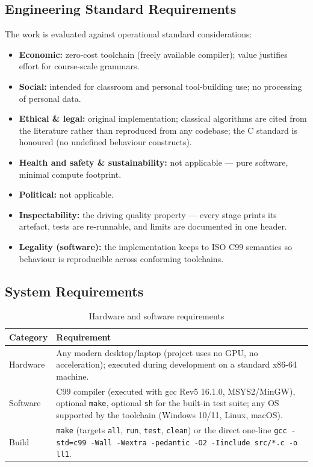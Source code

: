 \documentclass[12pt,a4paper,oneside,openany]{report}
\newcommand{\code}[1]{\texttt{#1}}
\begin{document}
\subsection{Engineering Standard Requirements}
The work is evaluated against operational standard considerations:
\begin{itemize}
  \item \textbf{Economic:} zero-cost toolchain (freely available
        compiler); value justifies effort for course-scale grammars.
  \item \textbf{Social:} intended for classroom and personal
        tool-building use; no processing of personal data.
  \item \textbf{Ethical \& legal:} original implementation; classical
        algorithms are cited from the literature rather than reproduced
        from any codebase; the C standard is honoured (no undefined
        behaviour constructs).
  \item \textbf{Health and safety \& sustainability:} not applicable ---
        pure software, minimal compute footprint.
  \item \textbf{Political:} not applicable.
  \item \textbf{Inspectability:} the driving quality property --- every
        stage prints its artefact, tests are re-runnable, and limits are
        documented in one header.
  \item \textbf{Legality (software):} the implementation keeps to ISO C99
        semantics \cite{isoC99} so behaviour is reproducible across
        conforming toolchains.
\end{itemize}

\subsection{System Requirements}
\begin{table}[h]
  \caption{Hardware and software requirements}
  \label{tab:swreq}
  \small
  \begin{tabularx}{\textwidth}{p{2.6cm}X}
    \toprule
    \textbf{Category} & \textbf{Requirement} \\
    \midrule
    Hardware & Any modern desktop/laptop (project uses no GPU, no
    acceleration); executed during development on a standard x86-64
    machine. \\
    Software & C99 compiler (executed with gcc Rev5 16.1.0, MSYS2/MinGW),
    optional \code{make}, optional \code{sh} for the built-in test
    suite; any OS supported by the toolchain (Windows 10/11, Linux,
    macOS). \\
    Build & \code{make} (targets \code{all}, \code{run}, \code{test},
    \code{clean}) or the direct one-line \code{gcc -std=c99 -Wall -Wextra
    -pedantic -O2 -Iinclude src/*.c -o ll1}. \\
    \bottomrule
  \end{tabularx}
\end{table}
\end{document}
